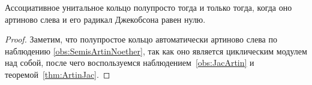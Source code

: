 \documentclass[
	extrafontsizes,
	11pt,
	hyphens,
]{memoir}
\begin{document}
%
%
%

\begin{corollary}
Ассоциативное унитальное кольцо полупросто тогда и только тогда,
\label{cor:ArtinJacRing}
когда оно артиново слева и его радикал Джекобсона равен нулю.
\end{corollary}

\begin{proof}
Заметим, что
полупростое кольцо автоматически артиново слева по наблюдению \ref{obs:SemisArtinNoether}, так как оно является циклическим модулем над собой,
после чего воспользуемся наблюдением~\ref{obs:JacArtin} и теоремой~\ref{thm:ArtinJac}.
\end{proof}
\end{document}
